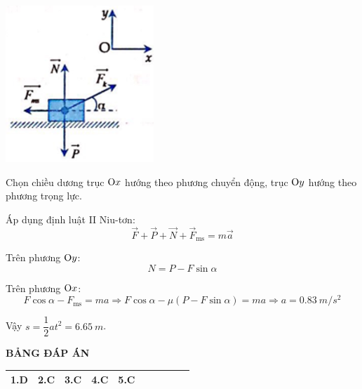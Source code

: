 \begin{enumerate}[label=\bfseries Câu \arabic*:]
{	\begin{center}
		\includegraphics[scale=1]{../figs/VN10-2021-PH-TP024-4.png}
	\end{center}
	Chọn chiều dương trục $\text O x$ hướng theo phương chuyển động, trục $\text O y$ hướng theo phương trọng lực.
		
	Áp dụng định luật II Niu-tơn:
	$$\vec F + \vec P + \vec N + \vec F_\text{ms} = m \vec a$$
	
	Trên phương $\text Oy$:
	$$N = P - F \sin \alpha$$
	
	Trên phương $\text Ox$:
	$$F \cos \alpha - F_\text{ms} = ma \Rightarrow F \cos \alpha  - \mu (P-F \sin \alpha) = ma \Rightarrow a=\SI{0.83}{m/s^2}$$
	
	Vậy $s=\dfrac{1}{2}at^2 = \SI{6.65}{m}$.
	}
	
\end{enumerate}

\whiteBGstarEnd

\loigiai
{
	\begin{center}
		\textbf{BẢNG ĐÁP ÁN}
	\end{center}
	\begin{center}
		\begin{tabular}{|m{2.8em}|m{2.8em}|m{2.8em}|m{2.8em}|m{2.8em}|m{2.8em}|m{2.8em}|m{2.8em}|m{2.8em}|m{2.8em}|}
			\hline
			1.D  & 2.C  & 3.C  & 4.C  & 5.C  & & & & &  \\
			\hline
			
		\end{tabular}
	\end{center}
}

